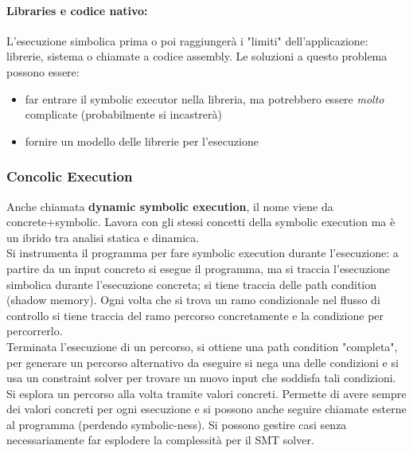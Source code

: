 \paragraph{Libraries e codice nativo:} L'esecuzione simbolica prima o poi raggiungerà i "limiti" dell'applicazione: librerie, sistema o chiamate a codice assembly. Le soluzioni a questo problema possono essere: 
\begin{itemize}
	\item far entrare il symbolic executor nella libreria, ma potrebbero essere \textit{molto} complicate (probabilmente si incastrerà)
	\item fornire un modello delle librerie per l'esecuzione
\end{itemize}

\newpage

\subsubsection{Concolic Execution}

Anche chiamata \textbf{dynamic symbolic execution}, il nome viene da concrete+symbolic. Lavora con gli stessi concetti della symbolic execution ma è un ibrido tra analisi statica e dinamica. \\

Si instrumenta il programma per fare symbolic execution durante l'esecuzione: a partire da un input concreto si esegue il programma, ma si traccia l'esecuzione simbolica durante l'esecuzione concreta; si tiene traccia delle path condition (shadow memory). Ogni volta che si trova un ramo condizionale nel flusso di controllo si tiene traccia del ramo percorso concretamente e la condizione per percorrerlo.\\

Terminata l'esecuzione di un percorso, si ottiene una path condition "completa", per generare un percorso alternativo da eseguire si nega una delle condizioni e si usa un constraint solver per trovare un nuovo input che soddisfa tali condizioni.\\

Si esplora un percorso alla volta tramite valori concreti. Permette di avere sempre dei valori concreti per ogni esecuzione e si possono anche seguire chiamate esterne al programma (perdendo symbolic-ness). Si possono gestire casi senza necessariamente far esplodere la complessità per il SMT solver.\\


